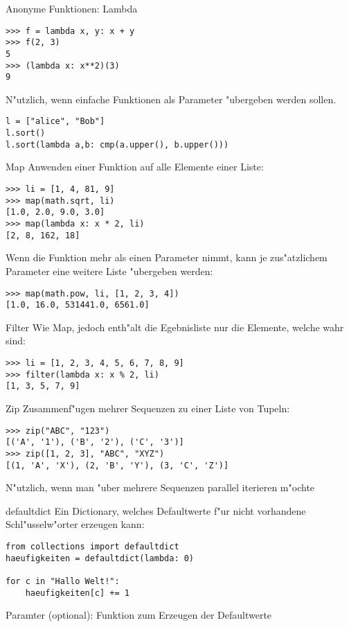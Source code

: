 \begin{frame}[fragile]{Anonyme Funktionen: Lambda}
\begin{lstlisting}[style=Shell]
>>> f = lambda x, y: x + y
>>> f(2, 3)
5
>>> (lambda x: x**2)(3)
9
\end{lstlisting}
N"utzlich, wenn einfache Funktionen als Parameter "ubergeben werden sollen.
\begin{lstlisting}[style=Python]
l = ["alice", "Bob"]
l.sort()
l.sort(lambda a,b: cmp(a.upper(), b.upper()))
\end{lstlisting}

\end{frame}

\begin{frame}[fragile]{Map}
Anwenden einer Funktion auf alle Elemente einer Liste:
\begin{lstlisting}[style=Shell]
>>> li = [1, 4, 81, 9]
>>> map(math.sqrt, li)
[1.0, 2.0, 9.0, 3.0]
>>> map(lambda x: x * 2, li)
[2, 8, 162, 18]
\end{lstlisting}
Wenn die Funktion mehr als einen Parameter nimmt, kann je zus"atzlichem Parameter eine weitere Liste "ubergeben werden:
\begin{lstlisting}[style=Shell]
>>> map(math.pow, li, [1, 2, 3, 4])
[1.0, 16.0, 531441.0, 6561.0]
\end{lstlisting}
\end{frame} 

\begin{frame}[fragile]{Filter}
Wie Map, jedoch enth"alt die Egebnisliste nur die Elemente, welche wahr sind:
\begin{lstlisting}[style=Shell]
>>> li = [1, 2, 3, 4, 5, 6, 7, 8, 9]
>>> filter(lambda x: x % 2, li)
[1, 3, 5, 7, 9]
\end{lstlisting}
\end{frame} 

\begin{frame}[fragile]{Zip}
Zusammenf"ugen mehrer Sequenzen zu einer Liste von Tupeln:
\begin{lstlisting}[style=Shell]
>>> zip("ABC", "123")
[('A', '1'), ('B', '2'), ('C', '3')]
>>> zip([1, 2, 3], "ABC", "XYZ")
[(1, 'A', 'X'), (2, 'B', 'Y'), (3, 'C', 'Z')]
\end{lstlisting}
N"utzlich, wenn man "uber mehrere Sequenzen parallel iterieren m"ochte
\end{frame}


\begin{frame}[fragile]{defaultdict}
Ein Dictionary, welches Defaultwerte f"ur nicht vorhandene Schl"usselw"orter erzeugen kann:
\begin{lstlisting}
from collections import defaultdict
haeufigkeiten = defaultdict(lambda: 0)

for c in "Hallo Welt!":
    haeufigkeiten[c] += 1
\end{lstlisting}
Paramter (optional): Funktion zum Erzeugen der Defaultwerte
\end{frame}

